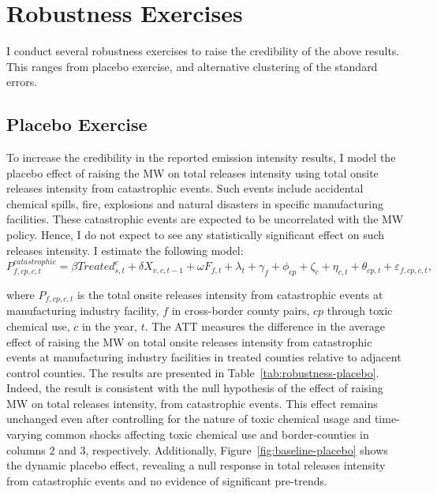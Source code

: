 \documentclass[12pt, english]{article}
\begin{document}
    \section{Robustness Exercises}\label{sec:robustness-exercises}
    I conduct several robustness exercises to raise the credibility of the above results. This ranges from placebo exercise, and alternative clustering of the standard errors.

    \subsection{Placebo Exercise}\label{subsec:placebo-exercise}
    To increase the credibility in the reported emission intensity results, I model the placebo effect of raising the MW on total releases intensity using total onsite releases intensity from catastrophic events. Such events include accidental chemical spills, fire, explosions and natural disasters in specific manufacturing facilities. These catastrophic events are expected to be uncorrelated with the MW policy. Hence, I do not expect to see any statistically significant effect on such releases intensity. I estimate the following model:
    \begin{equation}
        P_{f,cp,c,t}^{catastrophic} = \beta Treated_{s,t}^e + \delta X_{v,c,t-1} + \omega F_{f,t} + \lambda_{t} + \gamma_{f} + \phi_{cp} + \zeta_{c} + \eta_{c,t} + \theta_{cp,t} + \varepsilon_{f,cp,c,t},\label{eq:robustness-placebo}
    \end{equation}
    

    where $P_{f,cp,c,t}$ is the total onsite releases intensity from catastrophic events at manufacturing industry facility, $f$ in cross-border county pairs, $cp$ through toxic chemical use, $c$ in the year, $t$. The ATT measures the difference in the average effect of raising the MW on total onsite releases intensity from catastrophic events at manufacturing industry facilities in treated counties relative to adjacent control counties. The results are presented in Table~\ref{tab:robustness-placebo}. Indeed, the result is consistent with the null hypothesis of the effect of raising MW on total releases intensity, from catastrophic events. This effect remains unchanged even after controlling for the nature of toxic chemical usage and time-varying common shocks affecting toxic chemical use and border-counties in columns $2$ and $3$, respectively. Additionally, Figure~\ref{fig:baseline-placebo} shows the dynamic placebo effect, revealing a null response in total releases intensity from catastrophic events and no evidence of significant pre-trends.
    
\end{document}
